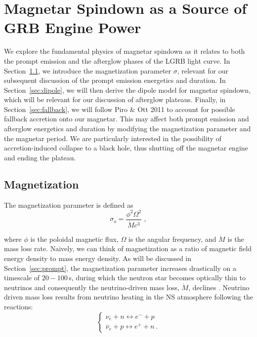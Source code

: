 \documentclass{article}
\begin{document}
\section{Magnetar Spindown as a Source of GRB Engine Power} 
We explore the fundamental physics of magnetar spindown as it relates to both the prompt emission and the afterglow phases of the LGRB light curve. In Section~\ref{sec:magnetization}, we introduce the magnetization parameter $\sigma$, relevant for our subsequent discussion of the prompt emission energetics and duration. In Section~\ref{sec:dipole}, we will then derive the dipole model for magnetar spindown, which will be relevant for our discussion of afterglow plateaus. Finally, in Section~\ref{sec:fallback}, we will follow Piro \& Ott 2011 \cite{Piro:2011ed} to account for possible fallback accretion onto our magnetar. This may affect both prompt emission and afterglow energetics and duration by modifying the magnetization parameter and the magnetar period.  We are particularly interested in the possibility of accretion-induced collapse to a black hole, thus shutting off the magnetar engine and ending the plateau.

\subsection{Magnetization} \label{sec:magnetization}

The magnetization parameter is defined as
\begin{equation}
\sigma_o= \frac{\phi^2 \Omega^2}{\dot{M} c^3}\,\,,
\end{equation}

where $\phi$ is the poloidal  magnetic flux, $\Omega$ is the angular frequency, and $\dot{M}$ is the mass loss rate. Naively, we can think of magnetization as a ratio of magnetic field energy density to mass energy density. As will be discussed in Section~\ref{sec:prompt}, the magnetization parameter increases drastically on a timescale of $20-100$\,s, during which the neutron star becomes optically thin to neutrinos and consequently the neutrino-driven mass loss, $\dot{M}$, declines \cite{Metzger:2010pp}. Neutrino driven mass loss results from neutrino heating in the NS atmosphere following the reactions:
\begin{equation}
\begin{cases}
\nu_e+ n \leftrightarrow e^- + p \\ \overline{\nu}_e+p \leftrightarrow e^+ + n \,.
\end{cases}
\end{equation}
\end{document}

